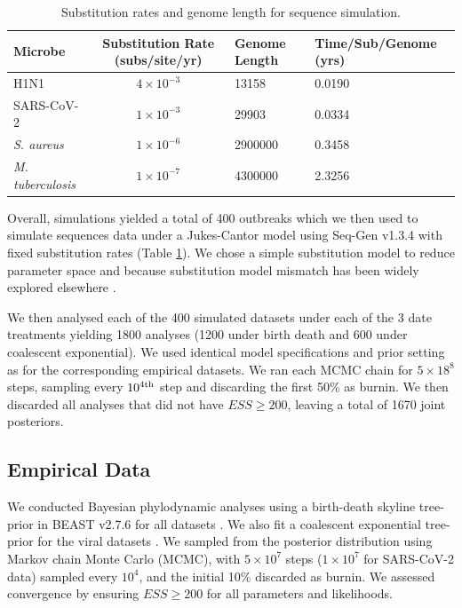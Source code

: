 \documentclass{article}
\begin{document}
\begin{spacing}{1.5}
\begin{table}[h!]
    \centering
    \caption{Substitution rates and genome length for sequence simulation.}
    \begin{tabular}{l|c|l|l}
    \hline
    Microbe                     &   Substitution Rate (subs/site/yr) & Genome Length & Time/Sub/Genome (yrs)  \\
    \hline
    H1N1                        & $4\times10^{-3}$ & 13158 & 0.0190\\
    SARS-CoV-2                  & $1\times10^{-3}$ & 29903 & 0.0334\\
    \textit{S. aureus}    & $1\times10^{-6}$ & 2900000  & 0.3458\\
    \textit{M. tuberculosis}    &   $1\times10^{-7}$ & 4300000 & 2.3256\\
    \hline
    \end{tabular}
    \label{tab:seq_parms}
\end{table}

Overall, simulations yielded a total of 400 outbreaks which we then used to simulate sequences data under a Jukes-Cantor model using Seq-Gen v1.3.4 \citep{rambaut_seq-gen_1997} with fixed substitution rates (Table \ref{tab:seq_parms}). We chose a simple substitution model to reduce parameter space and because substitution model mismatch has been widely explored elsewhere \citep{lemmon2004importance}.

We then analysed each of the 400 simulated datasets under each of the 3 date treatments yielding 1800 analyses (1200 under birth death and 600 under coalescent exponential). We used identical model specifications and prior setting as for the corresponding empirical datasets. We ran each MCMC chain for $5\times18^{8}$ steps, sampling every $10^{4\textnormal{th}}$ step and discarding the first 50\% as burnin. We then discarded all analyses that did not have $ESS\geq200$, leaving a total of 1670 joint posteriors.

\subsection*{Empirical Data}
We conducted Bayesian phylodynamic analyses using a birth-death skyline tree-prior in BEAST v2.7.6 for all datasets \citep{bouckaert_beast_2019,stadler2012estimating}. We also fit a coalescent exponential tree-prior for the viral datasets \citep{kingman_1982_coalescent}. We sampled from the posterior distribution using Markov chain Monte Carlo (MCMC), with $5\times10^{7}$ steps ($1\times10^{7}$ for SARS-CoV-2 data) sampled every $10^{4}$, and the initial 10\% discarded as burnin. We assessed convergence by ensuring $ESS\geq200$ for all parameters and likelihoods.


\end{spacing}
\end{document}
